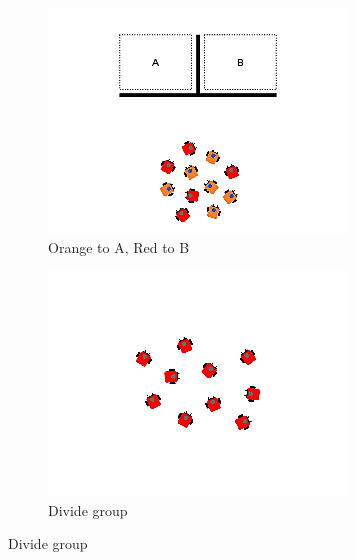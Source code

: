 \documentclass[]{article}
\begin{document}
\begin{figure}
\begin{subfigure}{0.42\textwidth}
		\includegraphics[width=\linewidth]{slide_images/Swarm_Robot_Control_-_10_Robot_0015.png}
		\caption{Orange to A, Red to B}
		\label{fig:sub1}
	\end{subfigure}%
	\begin{subfigure}{0.42\textwidth}
		\centering
		\includegraphics[width=\linewidth]{slide_images/Swarm_Robot_Control_-_10_Robot_0017.png}
		\caption{Divide group}
		\label{fig:sub2}
	\end{subfigure}
\end{figure}
	
\end{document}

